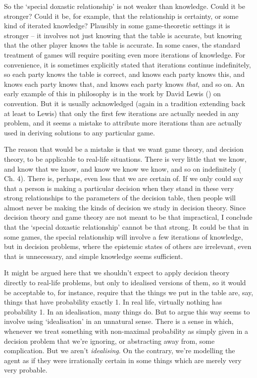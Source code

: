 \documentclass[
  11pt,
  letterpaper,
  DIV=11,
  numbers=noendperiod,
  twoside]{scrartcl}
\begin{document}
So the `special doxastic relationship' is not weaker than knowledge.
Could it be stronger? Could it be, for example, that the relationship is
certainty, or some kind of iterated knowledge? Plausibly in some
game-theoretic settings it is stronger -- it involves not just knowing
that the table is accurate, but knowing that the other player knows the
table is accurate. In some cases, the standard treatment of games will
require positing even more iterations of knowledge. For convenience, it
is sometimes explicitly stated that iterations continue indefinitely, so
each party knows the table is correct, and knows each party knows this,
and knows each party knows that, and knows each party knows \emph{that},
and so on. An early example of this in philosophy is in the work by
David Lewis () on convention. But it is
usually acknowledged (again in a tradition extending back at least to
Lewis) that only the first few iterations are actually needed in any
problem, and it seems a mistake to attribute more iterations than are
actually used in deriving solutions to any particular game.

The reason that would be a mistake is that we want game theory, and
decision theory, to be applicable to real-life situations. There is very
little that we know, and know that we know, and know we know we know,
and so on indefinitely ( Ch. 4). There is, perhaps, even less that we are certain of. If we
only could say that a person is making a particular decision when they
stand in these very strong relationships to the parameters of the
decision table, then people will almost never be making the kinds of
decision we study in decision theory. Since decision theory and game
theory are not meant to be that impractical, I conclude that the
`special doxastic relationship' cannot be that strong. It could be that
in some games, the special relationship will involve a few iterations of
knowledge, but in decision problems, where the epistemic states of
others are irrelevant, even that is unnecessary, and simple knowledge
seems sufficient.

It might be argued here that we shouldn't expect to apply decision
theory directly to real-life problems, but only to idealised versions of
them, so it would be acceptable to, for instance, require that the
things we put in the table are, say, things that have probability
exactly 1. In real life, virtually nothing has probability 1. In an
idealisation, many things do. But to argue this way seems to involve
using `idealisation' in an unnatural sense. There is a sense in which,
whenever we treat something with non-maximal probability as simply given
in a decision problem that we're ignoring, or abstracting away from,
some complication. But we aren't \emph{idealising}. On the contrary,
we're modelling the agent as if they were irrationally certain in some
things which are merely very very probable.
\end{document}

